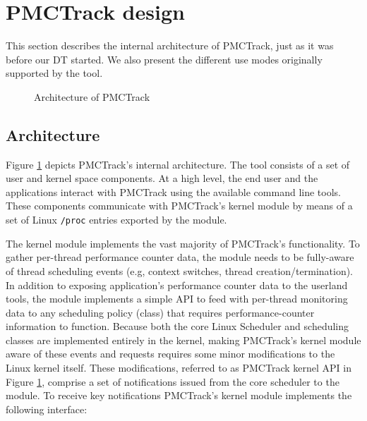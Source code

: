 \section{PMCTrack design}\label{pmctrack-design}

This section describes the internal architecture of PMCTrack, just as it
was before our DT started. We also present the different use modes originally supported by the tool.

\begin{figure}[tbp]
\centering
{}

\caption{Architecture of PMCTrack}
\label{fig:arch}
\end{figure}

\subsection{Architecture}\label{architecture}

Figure \ref{fig:arch} depicts PMCTrack's internal architecture. The tool
consists of a set of user and kernel space components. At a high level,
the end user and the applications interact with PMCTrack using the
available command line tools. These components communicate with
PMCTrack's kernel module by means of a set of Linux \texttt{/proc}
entries exported by the module.

The kernel module implements the vast majority of PMCTrack's
functionality. To gather per-thread performance counter data, the module
needs to be fully-aware of thread scheduling events (e.g, context
switches, thread creation/termination). In addition to exposing
application's performance counter data to the userland tools, the module
implements a simple API to feed with per-thread monitoring data to any
scheduling policy (class) that requires performance-counter information
to function. Because both the core Linux Scheduler and scheduling
classes are implemented entirely in the kernel, making PMCTrack's kernel
module aware of these events and requests requires some minor
modifications to the Linux kernel itself. These modifications, referred
to as PMCTrack kernel API in Figure \ref{fig:arch}, comprise a set of
notifications issued from the core scheduler to the module. To receive
key notifications PMCTrack's kernel module implements the following
interface:

